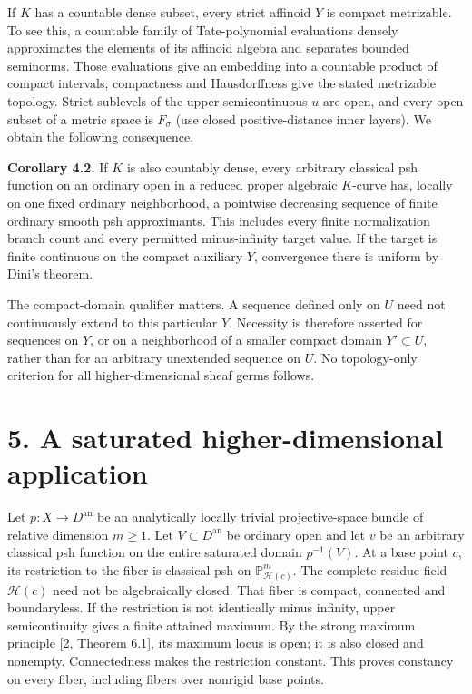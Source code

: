 \documentclass[
  11pt,
]{article}
\begin{document}
If \(K\) has a countable dense subset, every strict affinoid \(Y\) is
compact metrizable. To see this, a countable family of Tate-polynomial
evaluations densely approximates the elements of its affinoid algebra
and separates bounded seminorms. Those evaluations give an embedding
into a countable product of compact intervals; compactness and
Hausdorffness give the stated metrizable topology. Strict sublevels of
the upper semicontinuous \(u\) are open, and every open subset of a
metric space is \(F_\sigma\) (use closed positive-distance inner
layers). We obtain the following consequence.

\textbf{Corollary 4.2.} If \(K\) is also countably dense, every
arbitrary classical psh function on an ordinary open in a reduced proper
algebraic \(K\)-curve has, locally on one fixed ordinary neighborhood, a
pointwise decreasing sequence of finite ordinary smooth psh
approximants. This includes every finite normalization branch count and
every permitted minus-infinity target value. If the target is finite
continuous on the compact auxiliary \(Y\), convergence there is uniform
by Dini's theorem.

The compact-domain qualifier matters. A sequence defined only on \(U\)
need not continuously extend to this particular \(Y\). Necessity is
therefore asserted for sequences on \(Y\), or on a neighborhood of a
smaller compact domain \(Y'\subset U\), rather than for an arbitrary
unextended sequence on \(U\). No topology-only criterion for all
higher-dimensional sheaf germs follows.

\section{5. A saturated higher-dimensional
application}\label{a-saturated-higher-dimensional-application}

Let \(p:X\to D^{\mathrm{an}}\) be an analytically locally trivial
projective-space bundle of relative dimension \(m\geq1\). Let
\(V\subset D^{\mathrm{an}}\) be ordinary open and let \(v\) be an
arbitrary classical psh function on the entire saturated domain
\(p^{-1}(V)\). At a base point \(c\), its restriction to the fiber is
classical psh on \(\mathbb P^m_{\mathcal H(c)}\). The complete residue
field \(\mathcal H(c)\) need not be algebraically closed. That fiber is
compact, connected and boundaryless. If the restriction is not
identically minus infinity, upper semicontinuity gives a finite attained
maximum. By the strong maximum principle {[}2, Theorem 6.1{]}, its
maximum locus is open; it is also closed and nonempty. Connectedness
makes the restriction constant. This proves constancy on every fiber,
including fibers over nonrigid base points.
\end{document}
